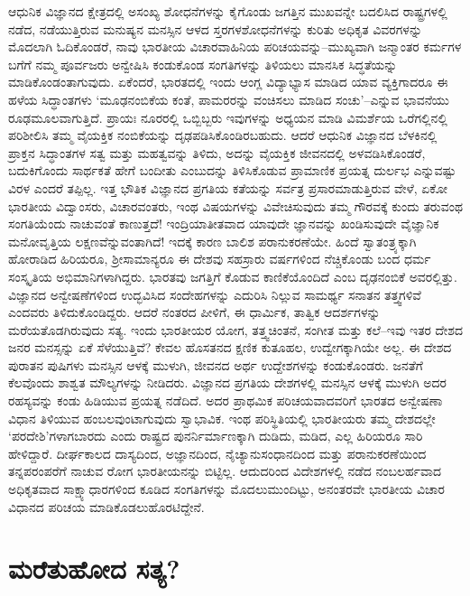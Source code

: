 ಆಧುನಿಕ ವಿಜ್ಞಾನದ ಕ್ಷೇತ್ರದಲ್ಲಿ ಅಸಂಖ್ಯ ಶೋಧನೆಗಳನ್ನು ಕೈಗೊಂಡು ಜಗತ್ತಿನ ಮುಖವನ್ನೇ ಬದಲಿಸಿದ ರಾಷ್ಟ್ರಗಳಲ್ಲಿ ನಡೆದ, ನಡೆಯುತ್ತಿರುವ ಮನುಷ್ಯನ ಮನಸ್ಸಿನ ಆಳದ ಸ್ತರಗಳ\break ಶೋಧನೆಗಳನ್ನು ಕುರಿತು ಅಧಿಕೃತ ವಿವರಗಳನ್ನು ಮೊದಲಾಗಿ ಓದಿಕೊಂಡರೆ, ನಾವು ಭಾರತೀಯ ವಿಚಾರವಾಹಿನಿಯ ಪರಿಚಯವನ್ನು–ಮುಖ್ಯವಾಗಿ ಜನ್ಮಾಂತರ ಕರ್ಮಗಳ ಬಗೆಗೆ ನಮ್ಮ ಪೂರ್ವ\-ಜರು ಅನ್ವೇಷಿಸಿ ಕಂಡುಕೊಂಡ ಸಂಗತಿಗಳನ್ನು ತಿಳಿಯಲು ಮಾನಸಿಕ ಸಿದ್ಧತೆಯನ್ನು ಮಾಡಿ\-ಕೊಂಡಂತಾ\-ಗುವುದು. ಏಕೆಂದರೆ, ಭಾರತದಲ್ಲಿ ಇಂದು ಆಂಗ್ಲ ವಿದ್ಯಾಭ್ಯಾಸ ಮಾಡಿದ ಯಾವ ವ್ಯಕ್ತಿಗಾದರೂ ಈ ಹಳೆಯ ಸಿದ್ಧಾಂತಗಳು ‘ಮೂಢನಂಬಿಕೆಯ ಕಂತೆ, ಪಾಮರರನ್ನು ವಂಚಿಸಲು ಮಾಡಿದ ಸಂಚು’–ಎನ್ನುವ ಭಾವನೆಯು ರೂಢಮೂಲವಾಗುತ್ತಿದೆ. ಪ್ರಾಯಃ ನೂರರಲ್ಲಿ ಒಬ್ಬಿಬ್ಬರು ಇವುಗಳನ್ನು ಅಧ್ಯಯನ ಮಾಡಿ ವಿಮರ್ಶೆಯ ಒರೆಗಲ್ಲಿನಲ್ಲಿ ಪರಿಶೀಲಿಸಿ ತಮ್ಮ ವೈಯಕ್ತಿಕ ನಂಬಿಕೆಯನ್ನು ದೃಢಪಡಿಸಿಕೊಂಡಿರಬಹುದು. ಆದರೆ ಆಧುನಿಕ ವಿಜ್ಞಾನದ ಬೆಳಕಿನಲ್ಲಿ ಪ್ರಾಕ್ತನ ಸಿದ್ಧಾಂತಗಳ ಸತ್ವ ಮತ್ತು ಮಹತ್ವವನ್ನು ತಿಳಿದು, ಅದನ್ನು ವೈಯಕ್ತಿಕ ಜೀವನದಲ್ಲಿ ಅಳವಡಿಸಿಕೊಂಡರೆ, ಬದುಕಿಗೊಂದು ಸಾರ್ಥಕತೆ ಹೇಗೆ ಬಂದೀತು ಎಂಬುದನ್ನು ತಿಳಿಸಿಕೊಡುವ ಪ್ರಾಮಾಣಿಕ ಪ್ರಯತ್ನ ದುರ್ಲಭ ಎನ್ನುವಷ್ಟು ವಿರಳ ಎಂದರೆ ತಪ್ಪಿಲ್ಲ. ಇತ್ತ ಭೌತಿಕ ವಿಜ್ಞಾನದ ಪ್ರಗತಿಯ ಕತೆಯನ್ನು ಸರ್ವತ್ರ ಪ್ರಸಾರಮಾಡುತ್ತಿರುವ ವೇಳೆ, ಏಕೋ ಭಾರತೀಯ ವಿದ್ವಾಂಸರು, ವಿಚಾರವಂತರು, ಇಂಥ ವಿಷಯಗಳನ್ನು ವಿವೇಚಿಸುವುದು ತಮ್ಮ ಗೌರವಕ್ಕೆ ಕುಂದು ತರುವಂಥ ಸಂಗತಿಯೆಂದು ನಾಚುವಂತೆ ಕಾಣುತ್ತದೆ! ಇಂದ್ರಿಯಾತೀತವಾದ ಯಾವುದೇ ಜ್ಞಾನವನ್ನು ಖಂಡಿಸುವುದೇ ವೈಜ್ಞಾನಿಕ ಮನೋವೃತ್ತಿಯ ಲಕ್ಷಣವೆನ್ನುವಂತಾಗಿದೆ! ಇದಕ್ಕೆ ಕಾರಣ ಬಾಲಿಶ ಪರಾನುಕರಣೆಯೇ. ಹಿಂದೆ ಸ್ವಾತಂತ್ರ್ಯಕ್ಕಾಗಿ ಹೋರಾಡಿದ ಹಿರಿಯರೂ, ಶ‍್ರೀಸಾಮಾನ್ಯರೂ ಈ ದೇಶವು ಸಹಸ್ರಾರು ವರ್ಷಗಳಿಂದ ನೆಚ್ಚಿಕೊಂಡು ಬಂದ ಧರ್ಮ ಸಂಸ್ಕೃತಿಯ ಅಭಿಮಾನಿಗಳಾಗಿದ್ದರು. ಭಾರತವು ಜಗತ್ತಿಗೆ ಕೊಡುವ ಕಾಣಿಕೆಯೊಂದಿದೆ ಎಂಬ ದೃಢನಂಬಿಕೆ ಅವರಲ್ಲಿತ್ತು. ವಿಜ್ಞಾನದ ಅನ್ವೇಷಣೆಗಳಿಂದ ಉದ್ಭವಿಸಿದ ಸಂದೇಹಗಳನ್ನು ಎದುರಿಸಿ ನಿಲ್ಲುವ ಸಾಮರ್ಥ್ಯ ಸನಾತನ ತತ್ತ್ವಗಳಿವೆ ಎಂದವರು ತಿಳಿದುಕೊಂಡಿದ್ದರು. ಆದರೆ ನಂತರದ ಪೀಳಿಗೆ, ಈ ಧಾರ್ಮಿಕ, ತಾತ್ವಿಕ ಆದರ್ಶಗಳನ್ನು ಮರೆಯತೊಡಗಿರುವುದು ಸತ್ಯ. ಇಂದು ಭಾರತೀಯರ ಯೋಗ, ತತ್ತ್ವಚಿಂತನೆ, ಸಂಗೀತ ಮತ್ತು ಕಲೆ–ಇವು ಇತರ ದೇಶದ ಜನರ ಮನಸ್ಸನ್ನು ಏಕೆ ಸೆಳೆಯುತ್ತಿವೆ? ಕೇವಲ ಹೊಸತನದ ಕ್ಷಣಿಕ ಕುತೂಹಲ, ಉದ್ವೇಗಕ್ಕಾಗಿಯೇ ಅಲ್ಲ. ಈ ದೇಶದ ಪುರಾತನ ಪುಷಿಗಳು ಮನಸ್ಸಿನ ಆಳಕ್ಕೆ ಮುಳುಗಿ, ಜೀವನದ ಅರ್ಥ ಉದ್ದೇಶಗಳನ್ನು ಕಂಡುಕೊಂಡರು. ಜನತೆಗೆ ಕೆಲವೊಂದು ಶಾಶ್ವತ ಮೌಲ್ಯಗಳನ್ನು ನೀಡಿದರು. ವಿಜ್ಞಾನದ ಪ್ರಗತಿಯ ದೇಶಗಳಲ್ಲಿ ಮನಸ್ಸಿನ ಆಳಕ್ಕೆ ಮುಳುಗಿ ಅದರ ರಹಸ್ಯವನ್ನು ಕಂಡು ಹಿಡಿಯುವ ಪ್ರಯತ್ನ ನಡೆದಿದೆ. ಅದರ ಪ್ರಾಥಮಿಕ ಪರಿಚಯವಾದವರಿಗೆ ಭಾರತದ ಅನ್ವೇಷಣಾ ವಿಧಾನ ತಿಳಿಯುವ ಹಂಬಲವುಂಟಾಗುವುದು ಸ್ವಾಭಾವಿಕ. ಇಂಥ ಪರಿಸ್ಥಿತಿಯಲ್ಲಿ ಭಾರತೀಯರು ತಮ್ಮ ದೇಶದಲ್ಲೇ ‘ಪರದೇಶಿ’ಗಳಾಗಬಾರದು ಎಂದು ರಾಷ್ಟ್ರದ ಪುನರ್ನಿರ್ಮಾಣಕ್ಕಾಗಿ ದುಡಿದು, ಮಡಿದ, ಎಲ್ಲ ಹಿರಿಯರೂ ಸಾರಿ ಹೇಳಿದ್ದಾರೆ. ದೀರ್ಘಕಾಲದ ದಾಸ್ಯದಿಂದ, ಅಜ್ಞಾನದಿಂದ, ನೈಚ್ಯಾನುಸಂಧಾನದಿಂದ ಮತ್ತು ಪರಾನುಕರಣೆಯಿಂದ ತನ್ನ\break ಪರಂಪರೆಗೆ ನಾಚುವ ರೋಗ ಭಾರತೀಯನನ್ನು ಬಿಟ್ಟಿಲ್ಲ. ಆದುದರಿಂದ ವಿದೇಶಗಳಲ್ಲಿ ನಡೆದ ನಂಬಲರ್ಹವಾದ ಅಧಿಕೃತವಾದ ಸಾಕ್ಷ್ಯಾಧಾರಗಳಿಂದ ಕೂಡಿದ ಸಂಗತಿಗಳನ್ನು ಮೊದಲು\break ಮುಂದಿಟ್ಟು, ಅನಂತರವೇ ಭಾರತೀಯ ವಿಚಾರ ವಿಧಾನದ ಪರಿಚಯ ಮಾಡಿಕೊಡಲು\break ಹೊರಟಿದ್ದೇನೆ.


\section*{ಮರೆತುಹೋದ ಸತ್ಯ?}

